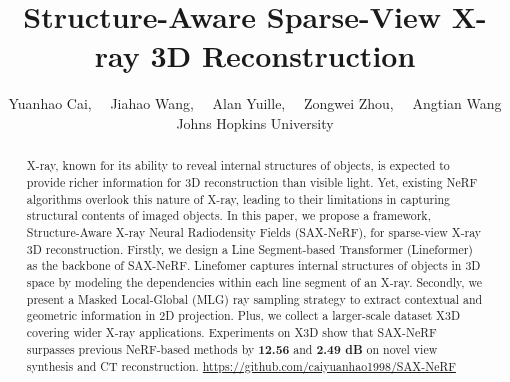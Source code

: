 \documentclass[10pt,twocolumn,letterpaper]{article}
\title{Structure-Aware Sparse-View X-ray 3D Reconstruction}
\author{Yuanhao Cai,~~ Jiahao Wang,~~ Alan Yuille,~~ Zongwei Zhou,~~ Angtian Wang \\
	Johns Hopkins University
}
\begin{document}


\vspace{4mm}
\begin{abstract}
	\vspace{-4mm}
	X-ray, known for its ability to reveal internal structures of objects, is expected to provide richer information for 3D reconstruction than visible light. Yet, existing NeRF algorithms overlook this nature of X-ray, leading to their limitations in capturing structural contents of imaged objects. In this paper, we propose a framework, Structure-Aware X-ray Neural Radiodensity Fields (SAX-NeRF), for sparse-view X-ray 3D reconstruction. Firstly, we design a Line Segment-based Transformer (Lineformer) as the backbone of SAX-NeRF. Linefomer captures internal structures of objects in 3D space by modeling the dependencies within each line segment of an X-ray. Secondly, we present a Masked Local-Global (MLG) ray sampling strategy to extract contextual and geometric information in 2D projection. Plus, we collect a larger-scale dataset X3D covering wider X-ray applications. Experiments on X3D show that SAX-NeRF surpasses previous NeRF-based methods by \textbf{12.56} and \textbf{2.49 dB} on novel view synthesis and CT reconstruction.  \url{https://github.com/caiyuanhao1998/SAX-NeRF}
\end{abstract}

\vspace{-1mm}
\let\thefootnote\relax{}
\end{document}
